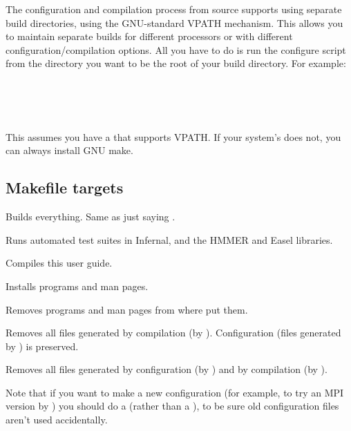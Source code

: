 The configuration and compilation process from source supports using
separate build directories, using the GNU-standard VPATH
mechanism. This allows you to maintain separate builds for different
processors or with different configuration/compilation options. All
you have to do is run the configure script from the directory you want
to be the root of your build directory.  For example:

\\
\\
\\

This assumes you have a  that supports VPATH. If your
system's  does not, you can always install GNU make.

\subsection{Makefile targets}

\begin{sreitems}{}

\item[\emprog{all}]
  Builds everything. Same as just saying .

\item[\emprog{check}]
  Runs automated test suites in Infernal, and the HMMER and Easel
  libraries.

\item[\emprog{pdf}]
  Compiles this user guide.

\item[\emprog{install}]
  Installs programs and man pages.

\item[\emprog{uninstall}]
  Removes programs and man pages from where  put them.

\item[\emprog{clean}]
  Removes all files generated by compilation (by
  ). Configuration (files generated by
  ) is preserved.

\item[\emprog{distclean}]
  Removes all files generated by configuration (by )
  and by compilation (by ). 

  Note that if you want to make a new configuration (for example, to
  try an MPI version by ) you
  should do a  (rather than a ), to be sure old configuration files aren't used
  accidentally.
\end{sreitems}

